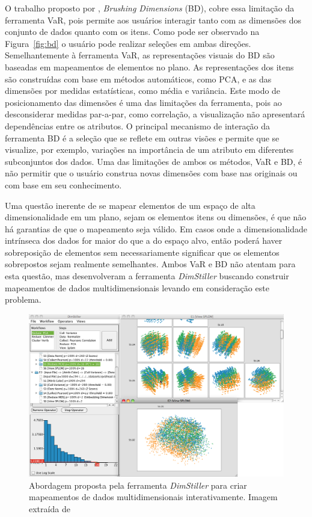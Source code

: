O trabalho proposto por \citet{Turkay2011}, \emph{Brushing
Dimensions} (BD), cobre essa limitação da ferramenta
VaR, pois permite aos usuários interagir tanto com as
dimensões dos conjunto de dados quanto com os itens.  Como
pode ser observado na Figura~\ref{fig:bd} o usuário pode
realizar seleções em ambas direções. Semelhantemente à
ferramenta VaR, as representações visuais do BD são baseadas
em mapeamentos de elementos no plano. As representações dos
itens são construídas com base em métodos automáticos, como
PCA, e as das dimensões por medidas estatísticas, como média
e variância. Este modo de posicionamento das dimensões é uma
das limitações da ferramenta, pois ao desconsiderar medidas
par-a-par, como correlação, a visualização não apresentará
dependências entre os atributos. O principal mecanismo de
interação da ferramenta BD é a seleção que se reflete em
outras visões e permite que se visualize, por exemplo,
variações na importância de um atributo em diferentes
subconjuntos dos dados. Uma das limitações de ambos os
métodos, VaR e BD, é não permitir que o usuário construa
novas dimensões com base nas originais ou com base em seu
conhecimento.

Uma questão inerente de se mapear elementos de um espaço de
alta dimensionalidade em um plano, sejam os elementos itens
ou dimensões, é que não há garantias de que o mapeamento
seja válido. Em casos onde a dimensionalidade intrínseca dos
dados for maior do que a do espaço alvo, então poderá haver
sobreposição de elementos sem necessariamente significar que
os elementos sobrepostos sejam realmente semelhantes. Ambos
VaR e BD não atentam para esta questão, mas
\citet{Ingram2010} desenvolveram a ferramenta
\emph{DimStiller} buscando construir mapeamentos de
dados multidimensionais levando em consideração este
problema. 

\begin{figure}[h!]
    \centering
    \includegraphics[width=16cm]{images/ds.png}
    \caption[DimStiller]
    {Abordagem proposta pela ferramenta \emph{DimStiller}
    para criar mapeamentos de dados multidimensionais
interativamente. Imagem extraída de \cite{Ingram2010}}
    \label{fig:ds}
\end{figure}

